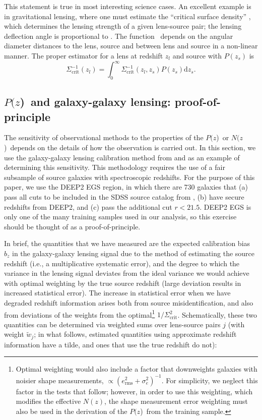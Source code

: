 \documentclass[12pt,preprint]{aastex}
\newcommand{\pofz}{$P(z$)}
\newcommand{\nofz}{$N(z$)}
\begin{document}
This statement is true in most interesting science cases.  An excellent example is in
gravitational lensing, where one must estimate the ``critical surface density''
\sigmacrit, which determines the lensing strength of a given lens-source pair; the
lensing deflection angle is proportional to \scinv.  The function
\sigmacrit\ depends on the angular diameter distances to the lens, source and
between lens and source in a non-linear manner.  The proper estimator for a lens
at redshift $z_{l}$ and source with $P(z_s)$ is
\begin{equation} \label{eq:calcscrit}
\Sigma^{-1}_{\mathrm{crit}}(z_l) = 
    \int_{0}^{\infty} \Sigma_{\mathrm{crit}}^{-1}(z_l, z_s) P(z_s) \mathrm{d}z_s.
\end{equation}


\subsection{\pofz\ and galaxy-galaxy lensing: proof-of-principle} \label{sec:pofp}

The sensitivity of observational methods to the properties of the
\pofz\ or \nofz\ depends on the details of how the observation is
carried out.  In
this section, we use the galaxy-galaxy lensing calibration method from
\cite{man08} and \citet{Nakajima11} as an example of determining this
sensitivity.  This methodology requires the use of a fair subsample of
source galaxies with spectroscopic redshifts.  For the purpose of this
paper, we use the DEEP2 EGS region, in which there are 730 galaxies
that (a) pass all cuts to be included in the SDSS source catalog from
\citet{MandelbaumSystematics05}, (b) have secure redshifts from DEEP2,
and (c) pass the additional cut $r<21.5$. 
DEEP2 EGS is only one of the many training samples used in our
analysis, 
so this exercise should be thought of as a proof-of-principle.

In brief, the quantities that we have measured are the expected calibration
bias $b_z$ in the galaxy-galaxy lensing signal due to the method of estimating
the source redshift (i.e., a multiplicative systematic error), and the degree to
which the variance in the lensing signal deviates from the ideal variance we
would achieve with optimal weighting by the true source redshift (large
deviation results in increased statistical error).  The increase in statistical
error when we have degraded redshift information arises both from source
misidentification, and also from deviations of the weights from the
optimal\footnote{Optimal weighting would also include a factor that downweights
galaxies with noisier shape measurements, $\propto (e_\mathrm{rms}^2 +
\sigma_e^2)^{-1}$.  For simplicity, we neglect this factor in the tests that
follow; however, in order to use this weighting, which modifies the effective
$N(z)$, the shape measurement error weighting must also be used in the
derivation of the \pofz\ from the training sample.} $1/\Sigma_\mathrm{crit}^2$.
Schematically, these two quantities can be determined via weighted sums over
lens-source pairs $j$ (with weight $\tilde{w}_j$; in what follows, estimated
quantities using approximate redshift information have a tilde, and ones that
use the true redshift do not):
\end{document}
